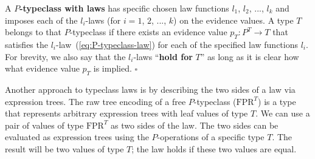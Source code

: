 A $P$\textbf{-typeclass with laws} has
specific chosen law functions $l_{1}$, $l_{2}$, ..., $l_{k}$ and
imposes each of the $l_{i}$-laws (for $i=1$, $2$, ..., $k$) on
the evidence values. A type $T$ belongs to that $P$-typeclass if
there exists an evidence value $p_{T}:P^{T}\rightarrow T$ that satisfies
the $l_{i}$-law~(\ref{eq:P-typeclass-law}) for each of the specified
law functions $l_{i}$. For brevity, we also say that the $l_{i}$-laws
\textsf{``}\textbf{hold for} $T$\textsf{''} as long as it is clear how what evidence
value $p_{T}$ is implied. $\square$

Another approach to typeclass laws is by describing the two sides
of a law via expression trees. The raw tree encoding of a free $P$-typeclass
($\text{FPR}^{T}$) is a type that represents arbitrary expression
trees with leaf values of type $T$. We can use a pair of values of
type $\text{FPR}^{T}$ as two sides of the law. The two sides can
be evaluated as expression trees using the $P$-operations of a specific
type $T$. The result will be two values of type $T$; the law holds
if these two values are equal.

